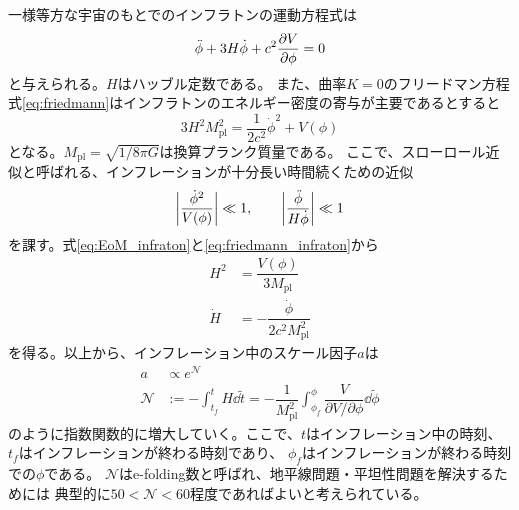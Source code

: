 \documentclass[../../main.tex]{subfiles}
\begin{document}
一様等方な宇宙のもとでのインフラトンの運動方程式は
\begin{equation}
    \label{eq:EoM_infraton}
    \ddot{\phi}+3H\dot{\phi}+c^2\pdv{V}{\phi} = 0
\end{equation}
と与えられる。$H$はハッブル定数である。
また、曲率$K=0$のフリードマン方程式\eqref{eq:friedmann}はインフラトンのエネルギー密度の寄与が主要であるとすると
\begin{equation}
    \label{eq:friedmann_infraton}
    3H^2M_{\mathrm{pl}}^2 = \dfrac{1}{2c^2}\dot{\phi}^2 +V(\phi)
\end{equation}
となる。$M_{\mathrm{pl}}=\sqrt{1/8\pi G}$は換算プランク質量である。
ここで、スローロール近似と呼ばれる、インフレーションが十分長い時間続くための近似
\begin{align}
    \qty|\dfrac{\dot{\phi}^2}{V(\phi)}| \ll 1,\qquad \qty|\dfrac{\ddot{\phi}}{H\dot{\phi}}| \ll 1
\end{align}
を課す。式\eqref{eq:EoM_infraton}と\eqref{eq:friedmann_infraton}から
\begin{align}
    H^2 &= \dfrac{V(\phi)}{3M_{\mathrm{pl}}} \\
    \dot{H} &= -\dfrac{\dot{\phi}}{2c^2M_{\mathrm{pl}}^2}
\end{align}
を得る。以上から、インフレーション中のスケール因子$a$は
\begin{align}
    a&\propto e^{\mathcal{N}} \\
    \mathcal{N} &:= -\int_{t_f}^{t}H\dd{\tilde{t}} = -\dfrac{1}{M_{\mathrm{pl}}^2}\int_{\phi_f}^{\phi}\dfrac{V}{\partial V/\partial \phi}\dd{\tilde{\phi}}
\end{align}
のように指数関数的に増大していく。ここで、$t$はインフレーション中の時刻、$t_f$はインフレーションが終わる時刻であり、
$\phi_f$はインフレーションが終わる時刻での$\phi$である。
$\mathcal{N}$はe-folding数と呼ばれ、地平線問題・平坦性問題を解決するためには
典型的に$50<\mathcal{N}<60$程度であればよいと考えられている。
\end{document}
